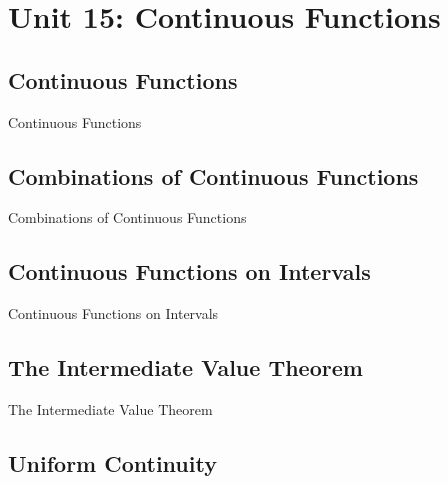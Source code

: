 \chapter{Unit 15: Continuous Functions}
\label{chap:unit15}

\section{Continuous Functions}
\label{sec:continuous-functions}

Continuous Functions

\section{Combinations of Continuous Functions}
\label{sec:combinations-of-continuous-functions}

Combinations of Continuous Functions

\section{Continuous Functions on Intervals}
\label{sec:continuous-functions-on-intervals}

Continuous Functions on Intervals

\section{The Intermediate Value Theorem}
\label{sec:the-intermediate-value-theorem}

The Intermediate Value Theorem

\section{Uniform Continuity}
\label{sec:uniform-continuity}

